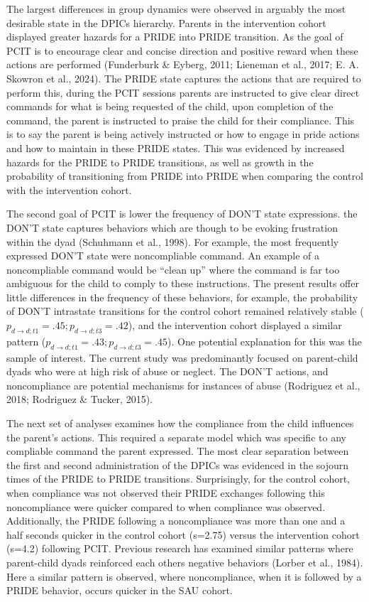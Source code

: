\documentclass[12pt]{./styles/outhesis}
\begin{document}
The largest differences in group dynamics were observed in arguably the
most desirable state in the DPICs hierarchy. Parents in the intervention
cohort displayed greater hazards for a PRIDE into PRIDE transition. As
the goal of PCIT is to encourage clear and concise direction and
positive reward when these actions are performed (Funderburk \& Eyberg,
2011; Lieneman et al., 2017; E. A. Skowron et al., 2024). The PRIDE
state captures the actions that are required to perform this, during the
PCIT sessions parents are instructed to give clear direct commands for
what is being requested of the child, upon completion of the command,
the parent is instructed to praise the child for their compliance. This
is to say the parent is being actively instructed or how to engage in
pride actions and how to maintain in these PRIDE states. This was
evidenced by increased hazards for the PRIDE to PRIDE transitions, as
well as growth in the probability of transitioning from PRIDE into PRIDE
when comparing the control with the intervention cohort.

The second goal of PCIT is lower the frequency of DON'T state
expressions. the DON'T state captures behaviors which are though to be
evoking frustration within the dyad (Schuhmann et al., 1998). For
example, the most frequently expressed DON'T state were noncompliable
command. An example of a noncompliable command would be ``clean up''
where the command is far too ambiguous for the child to comply to these
instructions. The present results offer little differences in the
frequency of these behaviors, for example, the probability of DON'T
intrastate transitions for the control cohort remained relatively stable
(\(p_{d\rightarrow d;t1}=.45;p_{d\rightarrow d;t3}=.42\)), and the
intervention cohort displayed a similar pattern
(\(p_{d\rightarrow d;t1}=.43;p_{d\rightarrow d;t3}=.45\)). One potential
explanation for this was the sample of interest. The current study was
predominantly focused on parent-child dyads who were at high risk of
abuse or neglect. The DON'T actions, and noncompliance are potential
mechanisms for instances of abuse (Rodriguez et al., 2018; Rodriguez \&
Tucker, 2015).

The next set of analyses examines how the compliance from the child
influences the parent's actions. This required a separate model which
was specific to any compliable command the parent expressed. The most
clear separation between the first and second administration of the
DPICs was evidenced in the sojourn times of the PRIDE to PRIDE
transitions. Surprisingly, for the control cohort, when compliance was
not observed their PRIDE exchanges following this noncompliance were
quicker compared to when compliance was observed. Additionally, the
PRIDE following a noncompliance was more than one and a half seconds
quicker in the control cohort (s=2.75) versus the intervention cohort
(s=4.2) following PCIT. Previous research has examined similar patterns
where parent-child dyads reinforced each others negative behaviors
(Lorber et al., 1984). Here a similar pattern is observed, where
noncompliance, when it is followed by a PRIDE behavior, occurs quicker
in the SAU cohort.
\end{document}
